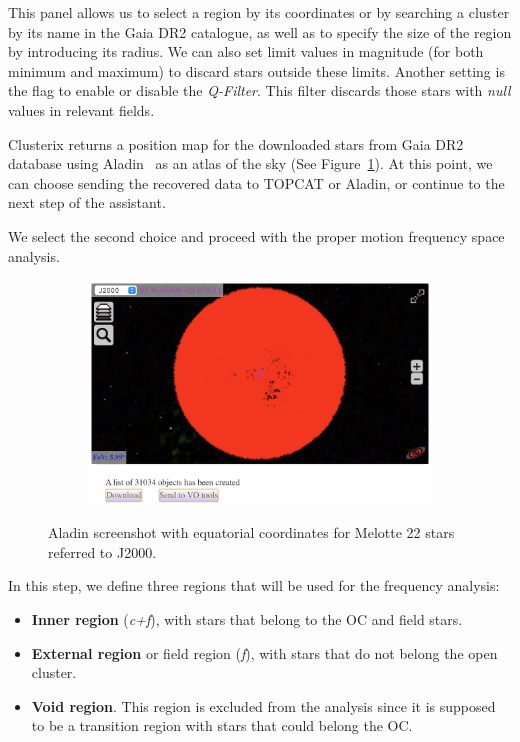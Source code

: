\documentclass[11pt, a4paper, english]{book}
\begin{document}
This panel allows us to select a region by its coordinates
or by searching a cluster by its name in the Gaia DR2 catalogue,
as well as to specify the size of the region by introducing its radius.
We can also set limit values in magnitude (for both minimum and maximum)
to discard stars outside these limits.
Another setting is the flag to enable or disable the \emph{Q-Filter}.
This filter discards those stars with \emph{null} values in relevant fields.

Clusterix returns a position map for the downloaded stars from Gaia DR2 database
using Aladin~\cite{bonnarel2000aladin} as an atlas of the sky (See Figure~\ref{fig:aladin_melotte_22}).
At this point, we can choose sending the recovered data to TOPCAT or Aladin,
or continue to the next step of the assistant.

We select the second choice and proceed with the proper motion frequency space analysis.

\begin{figure}[htbp]
  \centering
  \begin{subfigure}{0.9\textwidth}
    \centering
    \includegraphics[width=\textwidth]{../figures/clusterix/clusterix_aladin_selection_melotte_22.png}
  \end{subfigure}
  \caption{Aladin screenshot with equatorial coordinates for Melotte 22 stars referred to J2000.}
  \label{fig:aladin_melotte_22}
\end{figure}

In this step, we define three regions that will be used for the frequency analysis:

\begin{itemize}
  \item \textbf{Inner region} (\emph{c+f}), with stars that belong to the OC and field stars.
  \item \textbf{External region} or field region (\emph{f}), with stars that do not belong the open cluster.
  \item \textbf{Void region}. This region is excluded from the analysis since it is supposed
                to be a transition region with stars that could belong the OC.
\end{itemize}
\end{document}
